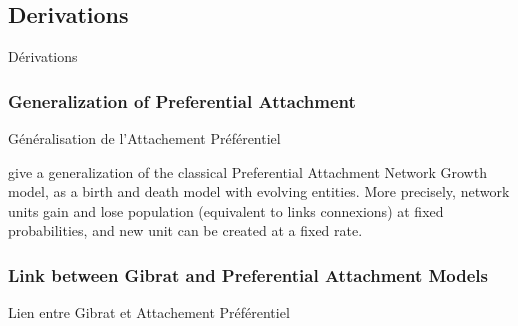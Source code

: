 






\subsection{Derivations}{Dérivations}

\subsubsection{Generalization of Preferential Attachment}{Généralisation de l'Attachement Préférentiel}

\cite{yamasaki2006preferential} give a generalization of the classical Preferential Attachment Network Growth model, as a birth and death model with evolving entities. More precisely, network units gain and lose population (equivalent to links connexions) at fixed probabilities, and new unit can be created at a fixed rate.

\subsubsection{Link between Gibrat and Preferential Attachment Models}{Lien entre Gibrat et Attachement Préférentiel}


